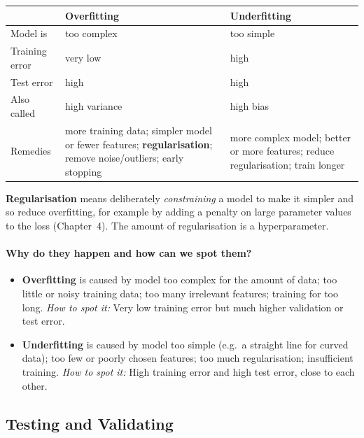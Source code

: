 \begin{center}
\begin{tabular}{@{}p{3.2cm}p{5.2cm}p{5.2cm}@{}}
\toprule
 & \textbf{Overfitting} & \textbf{Underfitting}\\
\midrule
Model is & too complex & too simple\\
Training error & very low & high\\
Test error & high & high\\
Also called & high variance & high bias\\
Remedies & more training data; simpler model or fewer features; \textbf{regularisation}; remove noise/outliers; early stopping & more complex model; better or more features; reduce regularisation; train longer\\
\bottomrule
\end{tabular}
\end{center}

\begin{definition}[: Regularisation]
\textbf{Regularisation} means deliberately \emph{constraining} a model to make it simpler and so reduce overfitting, for example by adding a penalty on large parameter values to the loss (Chapter~4). The amount of regularisation is a hyperparameter.
\end{definition}



\paragraph{Why do they happen and how can we spot them?}
\begin{itemize}
  \item \textbf{Overfitting} is caused by model too complex for the amount of data; too little or noisy training data; too many irrelevant features; training for too long. \emph{How to spot it:} Very low training error but much higher validation or test error.
  \item \textbf{Underfitting} is caused by model too simple (e.g.\ a straight line for curved data); too few or poorly chosen features; too much regularisation; insufficient training. \emph{How to spot it:} High training error and high test error, close to each other.
\end{itemize}

\subsection{Testing and Validating}

